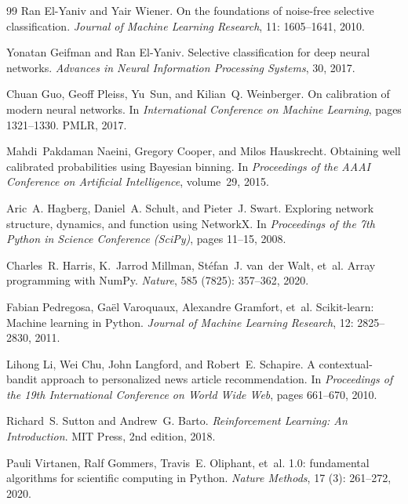 \documentclass[reprint,aps,prxquantum,amsmath,amssymb,floatfix,nofootinbib,longbibliography]{revtex4-2}
\theoremstyle{definition}
\theoremstyle{remark}
\theoremstyle{plain}
\begin{document}
\begin{thebibliography}{99}
Ran El-Yaniv and Yair Wiener.
\newblock On the foundations of noise-free selective classification.
\newblock \emph{Journal of Machine Learning Research}, 11: 1605--1641,
  2010.

Yonatan Geifman and Ran El-Yaniv.
\newblock Selective classification for deep neural networks.
\newblock \emph{Advances in Neural Information Processing Systems}, 30, 2017.

Chuan Guo, Geoff Pleiss, Yu~Sun, and Kilian~Q. Weinberger.
\newblock On calibration of modern neural networks.
\newblock In \emph{International Conference on Machine Learning}, pages
  1321--1330. PMLR, 2017.

Mahdi~Pakdaman Naeini, Gregory Cooper, and Milos Hauskrecht.
\newblock Obtaining well calibrated probabilities using {Bayesian} binning.
\newblock In \emph{Proceedings of the AAAI Conference on Artificial
  Intelligence}, volume~29, 2015.

Aric~A. Hagberg, Daniel~A. Schult, and Pieter~J. Swart.
\newblock Exploring network structure, dynamics, and function using {NetworkX}.
\newblock In \emph{Proceedings of the 7th Python in Science Conference
  (SciPy)}, pages 11--15, 2008.

Charles~R. Harris, K.~Jarrod Millman, St{\'e}fan~J. van~der Walt, et~al.
\newblock Array programming with {NumPy}.
\newblock \emph{Nature}, 585 (7825): 357--362, 2020.

Fabian Pedregosa, Ga{\"e}l Varoquaux, Alexandre Gramfort, et~al.
\newblock Scikit-learn: Machine learning in {Python}.
\newblock \emph{Journal of Machine Learning Research}, 12: 2825--2830,
  2011.

Lihong Li, Wei Chu, John Langford, and Robert~E. Schapire.
\newblock A contextual-bandit approach to personalized news article
  recommendation.
\newblock In \emph{Proceedings of the 19th International Conference on World
  Wide Web}, pages 661--670, 2010.

Richard~S. Sutton and Andrew~G. Barto.
\newblock \emph{Reinforcement Learning: An Introduction}.
\newblock MIT Press, 2nd edition, 2018.

Pauli Virtanen, Ralf Gommers, Travis~E. Oliphant, et~al.
 1.0: fundamental algorithms for scientific computing in
  {Python}.
\newblock \emph{Nature Methods}, 17 (3): 261--272, 2020.


\end{thebibliography}
\end{document}
